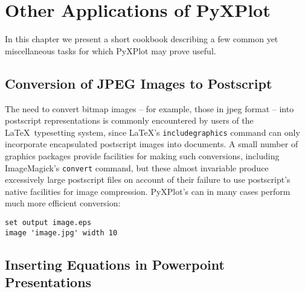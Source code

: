 %
%
%
%
%



\chapter{Other Applications of PyXPlot}

In this chapter we present a short cookbook describing a few common yet
miscellaneous tasks for which PyXPlot may prove useful.

\section{Conversion of JPEG Images to Postscript}

The need to convert bitmap images -- for example, those in jpeg format -- into
postscript representations is commonly encountered by users of the \LaTeX\
typesetting system, since \LaTeX's {\tt includegraphics} command can only
incorporate encapsulated postscript images into documents.  A small number of
graphics packages provide facilities for making such conversions, including
ImageMagick\index{ImageMagick}'s {\tt convert} command, but these almost
invariable produce excessively large postscript files on account of their
failure to use postscript's native facilities for image compression. PyXPlot's
\indcmdt{image} can in many cases perform much more efficient conversion:

\begin{verbatim}
set output image.eps
image 'image.jpg' width 10
\end{verbatim}

\section{Inserting Equations in Powerpoint Presentations}

